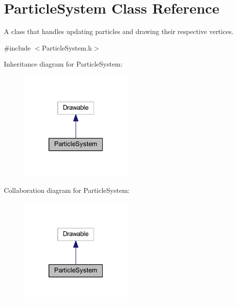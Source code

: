 \hypertarget{class_particle_system}{}\section{Particle\+System Class Reference}
\label{class_particle_system}


A class that handles updating particles and drawing their respective vertices.  




{\ttfamily \#include $<$Particle\+System.\+h$>$}



Inheritance diagram for Particle\+System\+:\nopagebreak
\begin{figure}[H]
\begin{center}
\leavevmode
\includegraphics[width=163pt]{class_particle_system__inherit__graph}
\end{center}
\end{figure}


Collaboration diagram for Particle\+System\+:\nopagebreak
\begin{figure}[H]
\begin{center}
\leavevmode
\includegraphics[width=163pt]{class_particle_system__coll__graph}
\end{center}
\end{figure}

